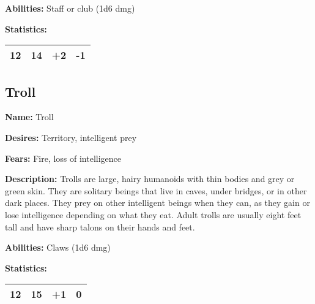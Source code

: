 \begin{multicols}{2}
\textbf{Abilities:} Staff or club (1d6 dmg)

\textbf{Statistics:}

\begin{center}
{
\begin{xtabular}{|l|l|l|l|}
12 & 14 & +2 & -1 \\
\hline
\end{xtabular}
}
\end{center}

\subsection{Troll}

\textbf{Name:} Troll

\textbf{Desires:} Territory, intelligent prey

\textbf{Fears:} Fire, loss of intelligence

\textbf{Description:} Trolls are large, hairy humanoids with thin bodies and grey or green skin.
They are solitary beings that live in caves, under bridges, or in other dark places. They prey
on other intelligent beings when they can, as they gain or lose intelligence depending on what
they eat. Adult trolls are usually eight feet tall and have sharp talons on their hands and feet.

\textbf{Abilities:} Claws (1d6 dmg)

\textbf{Statistics:}

\begin{center}
{
\begin{xtabular}{|l|l|l|l|}
12 & 15 & +1 & 0 \\
\hline
\end{xtabular}
}
\end{center}

\end{multicols}
